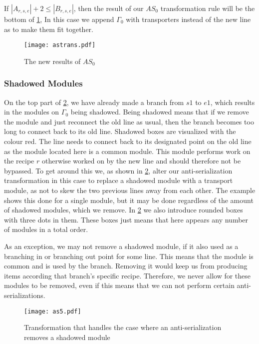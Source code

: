 If $|A_{r,s,e}| + 2 \leq |B_{r,s,e}|$,  then the result of our $AS_0$ transformation rule will be the bottom of \cref{fig:astrans}, In this case we append $\Gamma_0$ with transporters instead of the new line as to make them fit together.

\begin{figure}[H]
	\centering
	\texttt{[image: astrans.pdf]}
	\caption{The new results of $AS_0$}
	\label{fig:astrans}
\end{figure}

\subsubsection{Shadowed Modules}\label{sssec:shadow}
On the top part of \cref{fig:shadowexample},  we have already made a branch from $s1$ to $e1$, which results in the modules on $\Gamma_0$ being shadowed. Being shadowed means that if we remove the module and just reconnect the old line as usual, then the branch becomes too long to connect back to its old line. Shadowed boxes are visualized with the colour red. The line needs to connect back to its designated point on the old line as the module located here is a common module. This module  performs work on the recipe $r$ otherwise worked on by the new line and should therefore not be bypassed. To get around this we, as shown in \cref{fig:shadowexample}, alter our anti-serialization transformation in this case to replace a shadowed module with a transport module, as not to skew the two previous lines away from each other. The example shows this done for a single module, but it may be done regardless of the amount of shadowed modules, which we remove. In \cref{fig:shadowexample} we also introduce rounded boxes with three dots in them. These boxes just means that here appears any number of modules in a total order.

As an exception, we may not remove a shadowed module, if it also used as a branching in or branching out point for some line. This means that the module is common and is used by the branch. Removing it would keep us from producing items according that branch's specific recipe. Therefore, we never allow for these modules to be removed, even if this means that we can not perform certain anti-serializations.

\begin{figure}[H]
	\centering
	\texttt{[image: as5.pdf]}
	\caption{Transformation that handles the case where an anti-serialization removes a shadowed module}
	\label{fig:shadowexample}
\end{figure}

